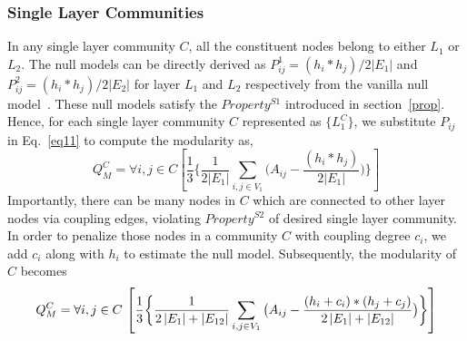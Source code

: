 

\subsubsection{Single Layer Communities}
In any single layer community $C$, all the constituent nodes belong to either $L_1$ or $L_2$. The null models
can be directly derived as $P^1_{ij}=(h_i*h_j)/2\left \vert E_1 \right \vert$ and $P^2_{ij}=(h_i*h_j)/2\left \vert E_2 \right \vert$ for
layer $L_1$ and $L_2$ respectively from the vanilla null model~\cite{newman2006modularity}. These null models satisfy
the $Property^{S1}$ introduced in section~\ref{prop}.
Hence, for each single layer community $C$ represented as $\{L^C_1\}$,
we substitute $P_{ij}$ in Eq.~\ref{eq11} to compute the modularity as,
\vspace{-0.05in}
\begin{dmath}
Q_M^C={\forall i,j \in C} \left [ \frac{1}{3} \bigg \{
\frac{1}{2\left \vert E_1 \right \vert} \sum_{i,j \in V_1}
\big(A_{ij} -
\frac{(h_i * h_j)}{2\left \vert E_1 \right \vert}\big) \bigg \} \right]  \end{dmath}
\vspace{-0.05in}
Importantly, there can be many nodes in $C$ which are connected to other layer nodes via coupling edges,
violating $Property^{S2}$ of desired single layer community.
In order to penalize those nodes in a community $C$ with coupling
degree $c_i$, we add $c_i$ along with $h_i$ to estimate the null model.
Subsequently, the modularity of $C$ becomes
\vspace{-0.05in}
\begin{dmath}\label{eq_single}
{Q_M^C=\forall i,j \in C}~ \penalty0{\left[ \frac{1}{3} \bigg \{
\frac{1}{2\left \vert E_1 \right \vert+\left \vert E_{12} \right \vert} \sum_{i,j \in V_1}
\big(A_{ij} - \penalty0
\frac{(h_i+c_i) * (h_j+c_j)}{2\left \vert E_1 \right \vert+\left \vert E_{12} \right \vert}\big) \bigg \}
\right]}
\end{dmath}
\vspace{-0.08in}

